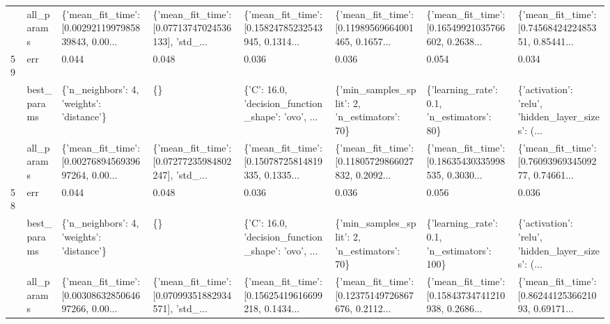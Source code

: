 \begin{tabular}{llllllll}
   & all\_params &  \{'mean\_fit\_time': [0.0029211997985839843, 0.00... &  \{'mean\_fit\_time': [0.07713747024536133], 'std\_... &  \{'mean\_fit\_time': [0.15824785232543945, 0.1314... &  \{'mean\_fit\_time': [0.11989569664001465, 0.1657... &  \{'mean\_fit\_time': [0.16549921035766602, 0.2638... &  \{'mean\_fit\_time': [0.7456842422485351, 0.85441... \\
59 & err &                                              0.044 &                                              0.048 &                                              0.036 &                                              0.036 &                                              0.054 &                                              0.034 \\
   & best\_params &          \{'n\_neighbors': 4, 'weights': 'distance'\} &                                                 \{\} &  \{'C': 16.0, 'decision\_function\_shape': 'ovo', ... &       \{'min\_samples\_split': 2, 'n\_estimators': 70\} &         \{'learning\_rate': 0.1, 'n\_estimators': 80\} &  \{'activation': 'relu', 'hidden\_layer\_sizes': (... \\
   & all\_params &  \{'mean\_fit\_time': [0.0027689456939697264, 0.00... &  \{'mean\_fit\_time': [0.07277235984802247], 'std\_... &  \{'mean\_fit\_time': [0.15078725814819335, 0.1335... &  \{'mean\_fit\_time': [0.11805729866027832, 0.2092... &  \{'mean\_fit\_time': [0.18635430335998535, 0.3030... &  \{'mean\_fit\_time': [0.7609396934509277, 0.74661... \\
58 & err &                                              0.044 &                                              0.048 &                                              0.036 &                                              0.036 &                                              0.056 &                                              0.036 \\
   & best\_params &          \{'n\_neighbors': 4, 'weights': 'distance'\} &                                                 \{\} &  \{'C': 16.0, 'decision\_function\_shape': 'ovo', ... &       \{'min\_samples\_split': 2, 'n\_estimators': 70\} &        \{'learning\_rate': 0.1, 'n\_estimators': 100\} &  \{'activation': 'relu', 'hidden\_layer\_sizes': (... \\
   & all\_params &  \{'mean\_fit\_time': [0.0030863285064697266, 0.00... &  \{'mean\_fit\_time': [0.07099351882934571], 'std\_... &  \{'mean\_fit\_time': [0.15625419616699218, 0.1434... &  \{'mean\_fit\_time': [0.12375149726867676, 0.2112... &  \{'mean\_fit\_time': [0.15843734741210938, 0.2686... &  \{'mean\_fit\_time': [0.8624412536621093, 0.69171... \\

\end{tabular}
